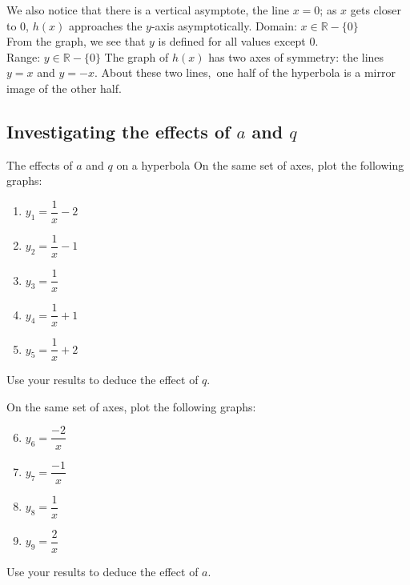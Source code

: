 \begin{wex}
{We also notice that there is a vertical asymptote, the line $x=0$; as $x$ gets closer to $0$, $h(x)$ approaches the $y$-axis asymptotically.
Domain: $x \in \mathbb{R} - \{0\}$\\
From the graph, we see that $y$ is defined for all values except $0$.\\
Range: $y \in \mathbb{R} - \{0\}$ 
The graph of $h(x)$ has two axes of symmetry: the lines $y=x$ and $y=-x$. About these two lines,\ one half of the hyperbola is a mirror image of the other half. 
}
\end{wex}




\subsection*{Investigating the effects of $a$ and $q$ }
\begin{Investigation}{The effects of $a$ and $q$ on a hyperbola}
  On the same set of axes, plot the following graphs:
  \begin{enumerate}[itemsep=3pt, label=\textbf{\arabic*}. ] 
  \item $y_1=\dfrac{1}{x}-2$
  \item $y_2=\dfrac{1}{x}-1$
  \item $y_3=\dfrac{1}{x}$
  \item $y_4=\dfrac{1}{x}+1$
  \item $y_5=\dfrac{1}{x}+2$
  \end{enumerate}
Use your results to deduce the effect of $q$.\\
\par
On the same set of axes, plot the following graphs:
\begin{enumerate}[itemsep=3pt, label=\textbf{\arabic*}. ] \setcounter{enumi}{5}
\item $y_6=\dfrac{-2}{x}$
\item $y_7=\dfrac{-1}{x}$
\item $y_8=\dfrac{1}{x}$
\item $y_9=\dfrac{2}{x}$
\end{enumerate}
\par
Use your results to deduce the effect of $a$.
\end{Investigation}

